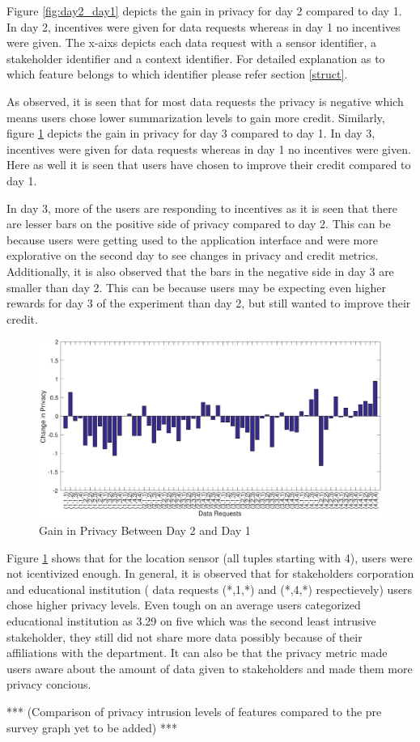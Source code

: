 Figure \ref{fig:day2_day1} depicts the gain in privacy for day 2 compared to day 1. In day 2, incentives were given for data requests whereas in day 1 no incentives were given. The x-aixs depicts each data request with a sensor identifier, a stakeholder identifier and a context identifier. For detailed explanation as to which feature belongs to which identifier please refer section \ref{struct}. 

As observed, it is seen that for most data requests the privacy is negative which means users chose lower summarization levels to gain more credit. Similarly, figure \ref{fig:day3_day1} depicts the gain in privacy for day 3 compared to day 1. In day 3, incentives were given for data requests whereas in day 1 no incentives were given. Here as well it is seen that users have chosen to improve their credit compared to day 1. 

In day 3, more of the users are responding to incentives as it is seen that there are lesser bars on the positive side of privacy compared to day 2. This can be because users were getting used to the application interface and were more explorative on the second day to see changes in privacy and credit metrics. Additionally, it is also observed that the bars in the negative side in day 3 are smaller than day 2. This can be because users may be expecting even higher rewards for day 3 of the experiment than day 2, but still wanted to improve their credit.

\begin{figure}[ht!]
\centering
\includegraphics[width=\textwidth,keepaspectratio]{./images/day3_day1_privacy}
\caption{Gain in Privacy Between Day 2 and Day 1}
\label{fig:day3_day1}
\end{figure}


Figure \ref{fig:day3_day1} shows that for the location sensor (all tuples starting with 4), users were not icentivized enough. In general, it is observed that for stakeholders corporation and educational institution ( data requests (*,1,*) and (*,4,*) respectievely) users chose higher privacy levels. Even tough on an average users categorized educational institution as 3.29 on five which was the second least intrusive stakeholder, they still did not share more data possibly because of their affiliations with the department. It can also be that the privacy metric made users aware about the amount of data given to stakeholders and made them more privacy concious.

*** (Comparison of privacy intrusion levels of features compared to the pre survey graph yet to be added) ***



